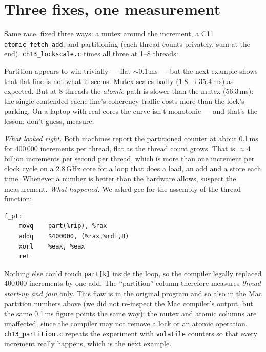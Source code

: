 \section{Three fixes, one measurement}
\label{sec:fix13}

Same race, fixed three ways: a mutex around the increment, a C11
\texttt{atomic\_fetch\_add}, and partitioning (each thread counts
privately, sum at the end). \texttt{ch13\_lockscale.c} times all
three at 1--8 threads:




\begin{example}
Partition appears to win trivially --- flat $\sim$0.1\,ms --- but
the next example shows that flat line is not what it seems. Mutex scales badly (1.8$\to$35.4\,ms) as expected. But at
8 threads the \emph{atomic} path is slower than the mutex
(56.3\,ms): the single contended cache line's coherency traffic
costs more than the lock's parking. On a laptop with real cores the
curve isn't monotonic --- and that's the lesson: don't guess,
measure.
\end{example}

\begin{example}
\emph{What looked right.} Both machines report the partitioned
counter at about 0.1\,ms for 400\,000 increments per thread, flat
as the thread count grows. That is $\approx$4 billion increments per
second per thread, which is more than one increment per clock cycle
on a 2.8\,GHz core for a loop that does a load, an add and a store
each time. Whenever a number is better than the hardware allows,
suspect the measurement.
\emph{What happened.} We asked gcc for the assembly of the thread
function:

\begin{lstlisting}[basicstyle=\ttfamily\scriptsize,caption={Real \texttt{gcc -O2 -S}
output for the partition worker of \texttt{ch13\_lockscale.c}. The loop is gone:
it became one addition of 400000.}]
f_pt:
	movq	part(%rip), %rax
	addq	$400000, (%rax,%rdi,8)
	xorl	%eax, %eax
	ret
\end{lstlisting}
Nothing else could touch \texttt{part[k]} inside the loop, so the
compiler legally replaced 400\,000 increments by one add. The
``partition'' column therefore measures \emph{thread start-up and
join} only. This flaw is in the original program and so also in the
Mac partition numbers above (we did not re-inspect the Mac compiler's
output, but the same 0.1\,ms figure points the same way); the mutex
and atomic columns are unaffected, since the compiler may not remove
a lock or an atomic operation. \texttt{ch13\_partition.c} repeats
the experiment with \texttt{volatile} counters so that every
increment really happens, which is the next example.
\end{example}

